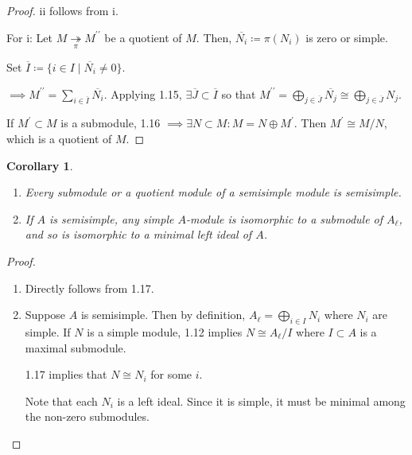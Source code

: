 \documentclass{article}
\theoremstyle{definition}
\theoremstyle{plain}
\newtheorem{corollary}[theorem]{Corollary}
\theoremstyle{remark}
\begin{document}
    \begin{proof}
        ii follows from i.

        For i: Let \(M \underset{\pi}{\twoheadrightarrow} M^{\prime\prime}\) be a quotient of \(M\). Then, \(\overline{N_i} \coloneqq \pi (N_i)\) is zero or simple.
        
        Set \(\overline{I} \coloneqq \{ i\in I \mid \overline{N_i} \neq 0 \} \).
        
        \(\implies M^{\prime\prime} = \sum_{i\in \overline{I}} \overline{N_i}\). Applying 1.15, \(\exists \overline{J} \subset \overline{I}\) so that \(M^{\prime\prime} = \bigoplus_{j\in \overline{J}} \overline{N_j} \cong \bigoplus_{j\in \overline{J}} N_j\).

        If \(M^{\prime} \subset M\) is a submodule, 1.16 \(\implies \exists N \subset M : M = N \oplus M^{\prime}\). Then \(M^{\prime} \cong M / N\), which is a quotient of \(M\).
    \end{proof}

    \begin{corollary}
        \begin{enumerate}[label=\roman*)]
            \item Every submodule or a quotient module of a semisimple module is semisimple.
            \item If \(A\) is semisimple, any simple \(A\)-module is isomorphic to a submodule of \(A_\ell\), and so is isomorphic to a minimal left ideal of \(A\). 
        \end{enumerate} 
    \end{corollary}

    \begin{proof}
        \begin{enumerate}[label=\roman*)]
            \item Directly follows from 1.17.
            \item  Suppose \(A\) is semisimple. Then by definition, \(A_\ell = \bigoplus_{i\in I} N_i\) where \(N_i\) are simple. If \(N\) is a simple module, 1.12 implies \(N \cong A_\ell / I\) where \(I \subset A\) is a maximal submodule.
            
            1.17 implies that \(N\cong N_i\) for some \(i\).

            Note that each \(N_i\) is a left ideal. Since it is simple, it must be minimal among the non-zero submodules.
        \end{enumerate} 
    \end{proof}
\end{document}
